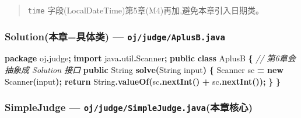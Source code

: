 \documentclass[
  11pt,
]{ctexart}
\newenvironment{Shaded}{\begin{snugshade}}{\end{snugshade}}
\newcommand{\BuiltInTok}[1]{#1}
\newcommand{\CommentTok}[1]{\textcolor[rgb]{0.56,0.35,0.01}{\textit{#1}}}
\newcommand{\ControlFlowTok}[1]{\textcolor[rgb]{0.13,0.29,0.53}{\textbf{#1}}}
\newcommand{\FunctionTok}[1]{\textcolor[rgb]{0.13,0.29,0.53}{\textbf{#1}}}
\newcommand{\ImportTok}[1]{#1}
\newcommand{\KeywordTok}[1]{\textcolor[rgb]{0.13,0.29,0.53}{\textbf{#1}}}
\newcommand{\NormalTok}[1]{#1}
\newcommand{\OperatorTok}[1]{\textcolor[rgb]{0.81,0.36,0.00}{\textbf{#1}}}
\begin{document}
\begin{quote}
\texttt{time} 字段(LocalDateTime)第5章(M4)再加,避免本章引入日期类。
\end{quote}

\hypertarget{solutionux672cux7ae0ux5177ux4f53ux7c7b-ojjudgeaplusb.java}{%
\subsubsection{\texorpdfstring{Solution(本章=具体类) ---
\texttt{oj/judge/AplusB.java}}{Solution(本章=具体类) --- oj/judge/AplusB.java}}\label{solutionux672cux7ae0ux5177ux4f53ux7c7b-ojjudgeaplusb.java}}

\begin{Shaded}
\begin{Highlighting}[]
\KeywordTok{package}\ImportTok{ oj}\OperatorTok{.}\ImportTok{judge}\OperatorTok{;}
\KeywordTok{import} \ImportTok{java}\OperatorTok{.}\ImportTok{util}\OperatorTok{.}\ImportTok{Scanner}\OperatorTok{;}
\KeywordTok{public} \KeywordTok{class}\NormalTok{ AplusB }\OperatorTok{\{}                  \CommentTok{// 第6章会抽象成 Solution 接口}
    \KeywordTok{public} \BuiltInTok{String} \FunctionTok{solve}\OperatorTok{(}\BuiltInTok{String}\NormalTok{ input}\OperatorTok{)} \OperatorTok{\{}
        \BuiltInTok{Scanner}\NormalTok{ sc }\OperatorTok{=} \KeywordTok{new} \BuiltInTok{Scanner}\OperatorTok{(}\NormalTok{input}\OperatorTok{);}
        \ControlFlowTok{return} \BuiltInTok{String}\OperatorTok{.}\FunctionTok{valueOf}\OperatorTok{(}\NormalTok{sc}\OperatorTok{.}\FunctionTok{nextInt}\OperatorTok{()} \OperatorTok{+}\NormalTok{ sc}\OperatorTok{.}\FunctionTok{nextInt}\OperatorTok{());}
    \OperatorTok{\}}
\OperatorTok{\}}
\end{Highlighting}
\end{Shaded}

\hypertarget{simplejudge-ojjudgesimplejudge.javaux672cux7ae0ux6838ux5fc3}{%
\subsubsection{\texorpdfstring{SimpleJudge ---
\texttt{oj/judge/SimpleJudge.java}(本章核心)}{SimpleJudge --- oj/judge/SimpleJudge.java(本章核心)}}\label{simplejudge-ojjudgesimplejudge.javaux672cux7ae0ux6838ux5fc3}}
\end{document}
